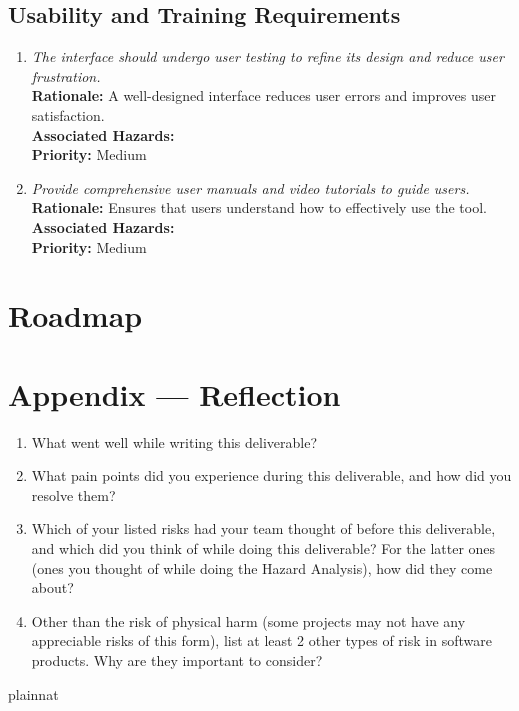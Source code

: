 \documentclass{article}
\begin{document}
\subsection{Usability and Training Requirements}
\begin{enumerate}[label=SR-UT \arabic*., wide=0pt, leftmargin=*]
    \item \emph{The interface should undergo user testing to refine its design and reduce user frustration.}\\[2mm]
    {\bf Rationale:} A well-designed interface reduces user errors and improves user satisfaction.\\
    {\bf Associated Hazards:} \\
    {\bf Priority:} Medium
    \item \emph{Provide comprehensive user manuals and video tutorials to guide users.}\\[2mm]
    {\bf Rationale:} Ensures that users understand how to effectively use the tool.\\
    {\bf Associated Hazards:} \\
    {\bf Priority:} Medium
\end{enumerate}

\section{Roadmap}


\newpage{}

\section*{Appendix --- Reflection}




\begin{enumerate}
    \item What went well while writing this deliverable? 
    \item What pain points did you experience during this deliverable, and how
    did you resolve them?
    \item Which of your listed risks had your team thought of before this
    deliverable, and which did you think of while doing this deliverable? For
    the latter ones (ones you thought of while doing the Hazard Analysis), how
    did they come about?
    \item Other than the risk of physical harm (some projects may not have any
    appreciable risks of this form), list at least 2 other types of risk in
    software products. Why are they important to consider?
\end{enumerate}

 {plainnat}

\end{document}

